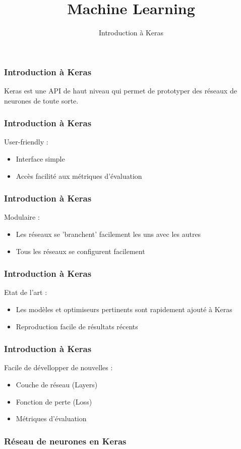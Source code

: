 \documentclass{formation}
\title{Machine Learning}
\subtitle{Introduction à Keras}
\begin{document}
\maketitle

\begin{frame}
  \frametitle{Introduction à Keras}
  Keras est une API de haut niveau qui permet de prototyper des réseaux de neurones de toute sorte.
\end{frame}

\begin{frame}
  \frametitle{Introduction à Keras}
  User-friendly :
  \begin{itemize}
  \item Interface simple
  \item Accès facilité aux métriques d'évaluation
  \end{itemize}
\end{frame}

\begin{frame}
  \frametitle{Introduction à Keras}
  Modulaire :
  \begin{itemize}
  \item Les réseaux se 'branchent' facilement les uns avec les autres
  \item Tous les réseaux se configurent facilement
  \end{itemize}
\end{frame}

\begin{frame}
  \frametitle{Introduction à Keras}
  Etat de l'art :
  \begin{itemize}
  \item Les modèles et optimiseurs pertinents sont rapidement ajouté à Keras
  \item Reproduction facile de résultats récents
  \end{itemize}
\end{frame}

\begin{frame}
  \frametitle{Introduction à Keras}
  Facile de dévellopper de nouvelles :
  \begin{itemize}
  \item Couche de réseau (Layers)
  \item Fonction de perte (Loss)
  \item Métriques d'évaluation
  \end{itemize}
\end{frame}

\begin{frame}
  \frametitle{Réseau de neurones en Keras}
  \inputminted[linenos,fontsize=\small,bgcolor=pythonbg]{python}{code-illustration/tf-keras-mlp.py}
\end{frame}
\end{document}
